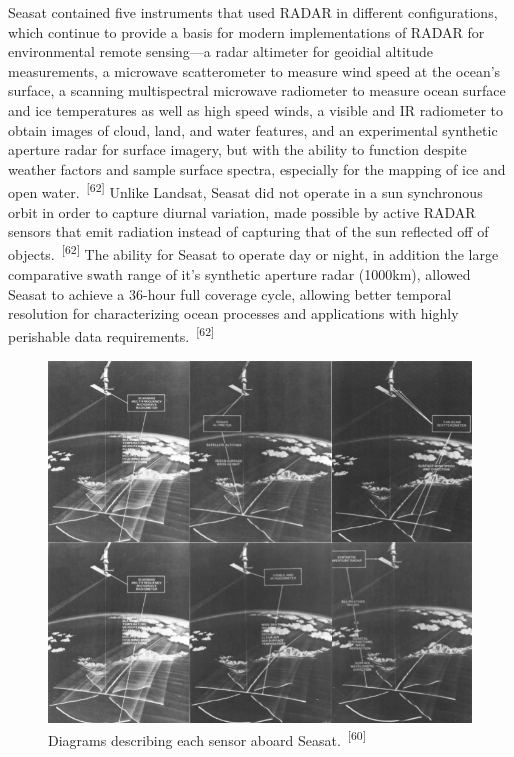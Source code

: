 \documentclass{article}
\begin{document}
\par{Seasat contained five instruments that used RADAR in different configurations, which continue to provide a basis for modern implementations of RADAR for environmental remote sensing---a radar altimeter for geoidial altitude measurements, a microwave scatterometer to measure wind speed at the ocean's surface, a scanning multispectral microwave radiometer to measure ocean surface and ice temperatures as well as high speed winds, a visible and IR radiometer to obtain images of cloud, land, and water features, and an experimental synthetic aperture radar for surface imagery, but with the ability to function despite weather factors and sample surface spectra, especially for the mapping of ice and open water.~\textsuperscript{[62]} Unlike Landsat, Seasat did not operate in a sun synchronous orbit in order to capture diurnal variation, made possible by active RADAR sensors that emit radiation instead of capturing that of the sun reflected off of objects.~\textsuperscript{[62]} The ability for Seasat to operate day or night, in addition the large comparative swath range of it's synthetic aperture radar (1000km), allowed Seasat to achieve a 36-hour full coverage cycle, allowing better temporal resolution for characterizing ocean processes and applications with highly perishable data requirements.~\textsuperscript{[62]}}


\begin{figure}
    \centering
    \includegraphics[width=0.8\linewidth]{images/seasat-sensors.png}
    \caption{Diagrams describing each sensor aboard Seasat.~\textsuperscript{[60]}}
    \label{figure17}
\end{figure}
\end{document}
